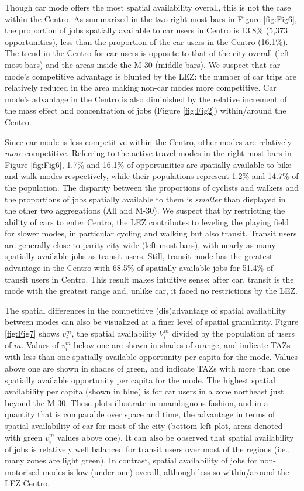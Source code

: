 \documentclass[10pt,letterpaper]{article}
\begin{document}
Though car mode offers the most spatial availability overall, this is
not the case within the Centro. As summarized in the two right-most bars
in Figure \ref{fig:Fig6}, the proportion of jobs spatially available to
car users in Centro is 13.8\% (5,373 opportunities), less than the
proportion of the car users in the Centro (16.1\%). The trend in the
Centro for car-users is opposite to that of the city overall (left-most
bars) and the areas inside the M-30 (middle bars). We suspect that
car-mode's competitive advantage is blunted by the LEZ: the number of
car trips are relatively reduced in the area making non-car modes more
competitive. Car mode's advantage in the Centro is also diminished by
the relative increment of the mass effect and concentration of jobs
(Figure \ref{fig:Fig2}) within/around the Centro.

Since car mode is less competitive within the Centro, other modes are
relatively \emph{more} competitive. Referring to the active travel modes
in the right-most bars in Figure \ref{fig:Fig6}, 1.7\% and 16.1\% of
opportunities are spatially available to bike and walk modes
respectively, while their populations represent 1.2\% and 14.7\% of the
population. The disparity between the proportions of cyclists and
walkers and the proportions of jobs spatially available to them is
\emph{smaller} than displayed in the other two aggregations (All and
M-30). We suspect that by restricting the ability of cars to enter
Centro, the LEZ contributes to leveling the playing field for slower
modes, in particular cycling and walking but also transit. Transit users
are generally close to parity city-wide (left-most bars), with nearly as
many spatially available jobs as transit users. Still, transit mode has
the greatest advantage in the Centro with 68.5\% of spatially available
jobs for 51.4\% of transit users in Centro. This result makes intuitive
sense: after car, transit is the mode with the greatest range and,
unlike car, it faced no restrictions by the LEZ.

The spatial differences in the competitive (dis)advantage of spatial
availability between modes can also be visualized at a finer level of
spatial granularity. Figure \ref{fig:Fig7} shows \(v_i^m\), the spatial
availability \(V_i^m\) divided by the population of users of \(m\).
Values of \(v_i^m\) below one are shown in shades of orange, and
indicate TAZs with less than one spatially available opportunity per
capita for the mode. Values above one are shown in shades of green, and
indicate TAZs with more than one spatially available opportunity per
capita for the mode. The highest spatial availability per capita (shown
in blue) is for car users in a zone northeast just beyond the M-30.
These plots illustrate in unambiguous fashion, and in a quantity that is
comparable over space and time, the advantage in terms of spatial
availability of car for most of the city (bottom left plot, areas
denoted with green \(v_i^m\) values above one). It can also be observed
that spatial availability of jobs is relatively well balanced for
transit users over most of the regions (i.e., many zones are light
green). In contrast, spatial availability of jobs for non-motorised
modes is low (under one) overall, although less so within/around the LEZ
Centro.
\end{document}
